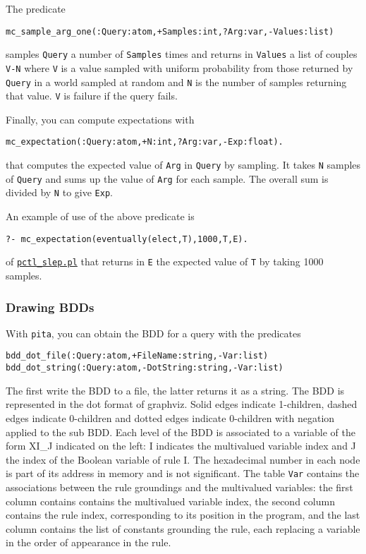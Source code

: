 The predicate
\begin{verbatim}
mc_sample_arg_one(:Query:atom,+Samples:int,?Arg:var,-Values:list)
\end{verbatim}
 samples \verb|Query| a number of \verb|Samples| times 
and returns in \verb|Values| a list of couples \verb|V-N| where 
\verb|V| is a value sampled with uniform probability from those returned 
by \verb|Query| in a world sampled at random and \verb|N| is the number of samples
returning that value.
\verb|V| is failure if the query fails.

Finally, you can compute expectations with 
\begin{verbatim}
mc_expectation(:Query:atom,+N:int,?Arg:var,-Exp:float).
\end{verbatim}
that computes the expected value of \verb|Arg| in \verb|Query| by
sampling.
It takes \verb|N| samples of \verb|Query| and sums up the value of \verb|Arg| for
each sample. The overall sum is divided by \verb|N| to give \verb|Exp|.

An example of use of the above predicate is
\begin{verbatim}
?- mc_expectation(eventually(elect,T),1000,T,E).
\end{verbatim}
of \href{http://cplint.lamping.unife.it/example/inference/pctl_slep.pl}{\texttt{pctl\_slep.pl}}
that returns in \verb|E| the expected value of \verb|T| by taking 1000 samples.

\subsubsection{Drawing BDDs}

With \verb|pita|, you can obtain the BDD for a query with the predicates
\begin{verbatim}
bdd_dot_file(:Query:atom,+FileName:string,-Var:list)
bdd_dot_string(:Query:atom,-DotString:string,-Var:list)
\end{verbatim}
The first write the BDD to a file, the latter returns it as a string.
The BDD is represented in the dot format of graphviz.
Solid edges indicate 1-children, dashed edges indicate 0-children and dotted
edges indicate 0-children with negation applied to the sub BDD.
Each level of the BDD is associated to a variable of the form XI\_J indicated on the left:
I indicates the multivalued variable index and J the index of the Boolean variable of rule I.
The hexadecimal number in each node is part of its address in memory and is not significant.
The table \verb|Var| contains the associations between the rule groundings and the
multivalued variables: the first column contains contains the multivalued variable index,
the second column contains the rule index, corresponding
to its position in the program, and the last column contains the list 
of constants grounding the rule, each replacing a variable in the order of appearance in the
rule.

